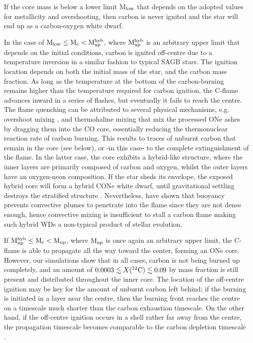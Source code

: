 \documentclass[../../main/thesis_msc.tex]{subfiles}
\begin{document}
    If the core mass is below a lower limit M$_{\rm low}$ that depends on the adopted values for metallicity and overshooting, then carbon is never ignited and the star will end up as a carbon-oxygen white dwarf. 
    
    In the case of $\rm M_{\rm low} \leq \rm M_c < \rm M_{\rm up}^{\rm hyb}$, where $\rm M_{\rm up}^{\rm hyb}$ is an arbitrary upper limit that depends on the initial conditions, carbon is ignited off-centre due to a temperature inversion in a similar fashion to typical SAGB stars. The ignition location  depends on both the initial mass of the star, and the carbon mass fraction. As long as the temperature at the bottom of the carbon-burning remains higher than the temperature required for carbon ignition, the C-flame advances inward in a series of flashes, but eventually it fails to reach the centre. The flame quenching can be attributed to several physical mechanisms, e.g. overshoot mixing \citep{Denissenkov:2013qaa, Chen2014, Farmer:2015afs}, and thermohaline mixing \citep{Siess2009} that mix the processed ONe ashes by dragging them into the CO core, essentially reducing the thermonuclear reaction rate of carbon burning. This results to traces of unburnt carbon that remain in the core (see below), or -in this case- to the complete extinguishment of the flame. In the latter case, the core exhibits a hybrid-like structure, where the inner layers are primarily composed of carbon and oxygen, whilst the outer layers have an oxygen-neon composition. If the star sheds its envelope, the exposed hybrid core will form a hybrid CONe white dwarf, until gravitational settling destroys the stratified structure \citep[see also][]{brooks2017, Schwab2019b}. Nevertheless, \cite{Lecoanet2016} have shown that buoyancy prevents convective plumes to penetrate into the flame since they are not dense enough, hence convective mixing is insufficient to stall a carbon flame making such hybrid WDs a non-typical product of stellar evolution.
    
    If $\rm M_{\rm up}^{\rm hyb} \leq \rm M_c < \rm M_{\rm up}$, where $\rm M_{\rm up}$ is once again an arbitrary upper limit, the C-flame is able to propagate all the way toward the center, forming an ONe core. However, our simulations show that in all cases, carbon is not being burned up completely, and an amount of $0.0003 \lesssim X(^{12}\rm C) \lesssim 0.09$ by mass fraction is still present and distributed throughout the inner core. The location of the off-centre ignition may be key for the amount of unburnt carbon left behind; if the burning is initiated in a layer near the centre, then the burning front reaches the centre on a timescale much shorter than the carbon exhaustion timescale. On the other hand, if the off-centre ignition occurs in a shell rather far away from the centre, the propagation timescale becomes comparable to the carbon depletion timescale \citep{Dominguez1993}.
    
\end{document}
